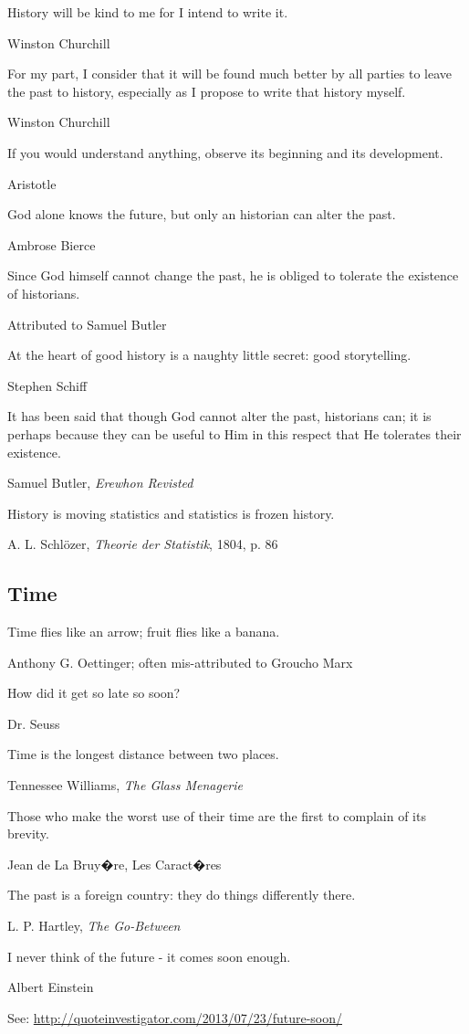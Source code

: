 \epigraph{History will be kind to me for I intend to write it.}{Winston Churchill}

\epigraph{For my part, I consider that it will be found much better by all parties to leave the past to history, especially as I propose to write that history myself.}{Winston Churchill}

\epigraph{If you would understand anything, observe its beginning and its development.}{Aristotle}

\epigraph{God alone knows the future, but only an historian can alter the past.}{Ambrose Bierce}

\epigraph{Since God himself cannot change the past, he is obliged to tolerate the existence of historians.}{Attributed to Samuel Butler}

\epigraph{At the heart of good history is a naughty little secret: good storytelling.}{Stephen Schiff}

\epigraph{It has been said that though God cannot alter the past, historians can; it is perhaps because they can be useful to Him in this respect that He tolerates their existence.}{Samuel Butler, \emph{Erewhon Revisted}}

\epigraph{History is moving statistics and statistics is frozen history.}{A. L. Schl\"ozer, \emph{Theorie der Statistik}, 1804, p. 86}


\subsection{Time}

\epigraph{Time flies like an arrow; fruit flies like a banana.}{Anthony G. Oettinger; often mis-attributed to Groucho Marx}

\epigraph{How did it get so late so soon? }{Dr. Seuss}

\epigraph{Time is the longest distance between two places.}{Tennessee Williams, \emph{The Glass Menagerie}}

\epigraph{Those who make the worst use of their time are the first to complain of its brevity.}{Jean de La Bruy�re, Les Caract�res }


\epigraph{The past is a foreign country: they do things differently there.}{L. P. Hartley, \emph{The Go-Between}}

\epigraph{I never think of the future - it comes soon enough.}{Albert Einstein}
See: \url{http://quoteinvestigator.com/2013/07/23/future-soon/}

